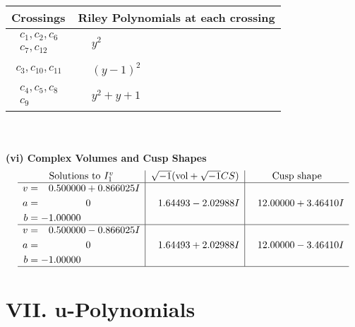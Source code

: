 \documentclass[1p]{elsarticle_modified}
\theoremstyle{definition}
\newcommand{\I}{\sqrt{-1}}
\begin{document}
\begin{tabular}{m{50pt}|m{274pt}}
Crossings & \hspace{64pt}Riley Polynomials at each crossing \\
\hline $$\begin{aligned}c_{1},c_{2},c_{6}\\c_{7},c_{12}\end{aligned}$$&$\begin{aligned}
&y^2
\end{aligned}$\\
\hline $$\begin{aligned}c_{3},c_{10},c_{11}\end{aligned}$$&$\begin{aligned}
&(y-1)^2
\end{aligned}$\\
\hline $$\begin{aligned}c_{4},c_{5},c_{8}\\c_{9}\end{aligned}$$&$\begin{aligned}
&y^2+y+1
\end{aligned}$\\
\hline
\end{tabular}\\~\\
\newpage\flushleft \textbf{(vi) Complex Volumes and Cusp Shapes}
$$\begin{array}{c|c|c}  
\text{Solutions to }I^v_{1}& \I (\text{vol} + \sqrt{-1}CS) & \text{Cusp shape}\\
 \hline 
\begin{aligned}
v &= \phantom{-}0.500000 + 0.866025 I \\
a &= \phantom{-0.000000 } 0 \\
b &= -1.00000\phantom{ +0.000000I}\end{aligned}
 & \phantom{-}1.64493 - 2.02988 I & \phantom{-}12.00000 + 3.46410 I \\ \hline\begin{aligned}
v &= \phantom{-}0.500000 - 0.866025 I \\
a &= \phantom{-0.000000 } 0 \\
b &= -1.00000\phantom{ +0.000000I}\end{aligned}
 & \phantom{-}1.64493 + 2.02988 I & \phantom{-}12.00000 - 3.46410 I\\
 \hline 
 \end{array}$$\newpage
\newpage\renewcommand{\arraystretch}{1}
\centering \section*{ VII. u-Polynomials}
\end{document}

